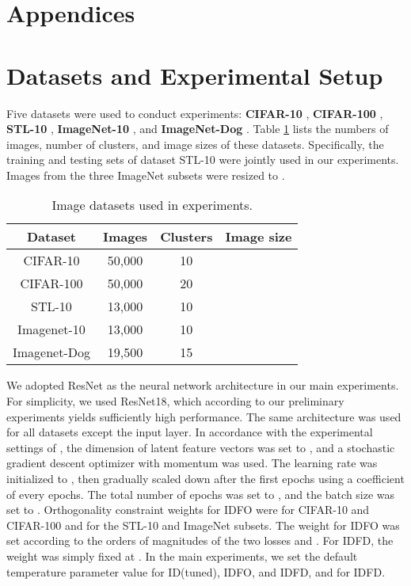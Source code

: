 \documentclass{article} \usepackage{iclr2021_conference,times}
\begin{document}


\newpage
\appendix
\appendix
{}
\section*{Appendices}

\section{Datasets and Experimental Setup}
\label{appendix_dataset}
Five datasets were used to conduct experiments:
{\bf CIFAR-10} \cite{krizhevsky2009learning}, {\bf CIFAR-100} \cite{krizhevsky2009learning}, {\bf STL-10} \cite{coates2011analysis}, {\bf ImageNet-10} \cite{deng2009imagenet}, and {\bf ImageNet-Dog} \cite{deng2009imagenet}. Table \ref{tab:dataList} lists the numbers of images, number of clusters, and image sizes of these datasets. Specifically, the training and testing sets of dataset STL-10 were jointly used in our experiments. Images from the three ImageNet subsets were resized to . 

\begin{table}[h]
  \caption{Image datasets used in experiments.}
  \label{tab:dataList}
  \centering
  \begin{tabular}{cccl}
    \toprule
    Dataset&Images&Clusters&Image size\\
    \midrule
    CIFAR-10 \cite{krizhevsky2009learning} & 50,000 & 10 &  \\
    CIFAR-100 \cite{krizhevsky2009learning} & 50,000 & 20 &  \\
STL-10 \cite{coates2011analysis} & 13,000 & 10 &  \\
    Imagenet-10 \cite{deng2009imagenet} & 13,000 & 10 &  \\
    Imagenet-Dog \cite{deng2009imagenet} & 19,500 & 15 &  \\
\bottomrule
\end{tabular}
\end{table}

We adopted ResNet \cite{He2015} as the neural network architecture in our main experiments. For simplicity, we used ResNet18, which according to our preliminary experiments yields sufficiently high performance. The same architecture was used for all datasets except the input layer. In accordance with the experimental settings of \cite{wu2018unsupervised}, the dimension of latent feature vectors was set to , and a stochastic gradient descent optimizer with momentum  was used. The learning rate  was initialized to , then gradually scaled down after the first  epochs using a coefficient of  every  epochs. The total number of epochs was set to , and the batch size was set to . Orthogonality constraint weights for IDFO were  for CIFAR-10 and CIFAR-100 and  for the STL-10 and ImageNet subsets. The weight for IDFO  was set according to the orders of magnitudes of the two losses  and . For IDFD, the weight  was simply fixed at . In the main experiments, we set the default temperature parameter value  for ID(tuned), IDFO, and IDFD, and  for IDFD. 
\end{document}
